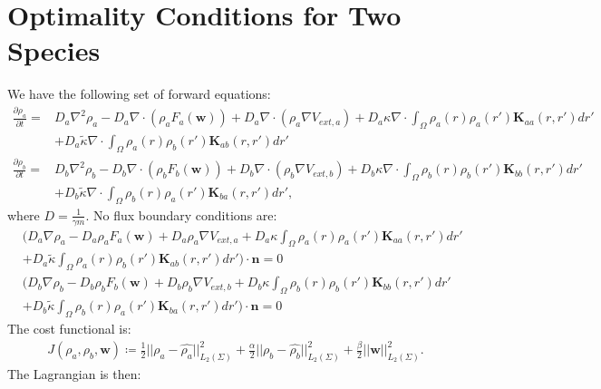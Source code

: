 \documentclass[11pt, a4paper]{article}
\theoremstyle{definition}
\newcommand{\ra}{\rho_a}
\newcommand{\rb}{\rho_b}
\newcommand{\w}{\mathbf{w}}
\newcommand{\n}{\mathbf{n}}
\newcommand{\K}{\mathbf{K}}
\begin{document}
	\section{Optimality Conditions for Two Species}
	We have the following set of forward equations:
	\begin{align*}
	\frac{\partial \ra}{\partial t} =& D_a\nabla^2 \ra - D_a\nabla \cdot(\ra F_a(\w)) + D_a \nabla \cdot (\ra \nabla V_{ext,a}) + D_a\kappa \nabla \cdot \int_\Omega \ra(r) \ra (r') \K_{aa}(r,r')dr' \\
	&+  D_a\tilde{\kappa}\nabla \cdot \int_\Omega \ra(r) \rb (r') \K_{ab}(r,r')dr'\\
	\frac{\partial \rb}{\partial t} =& D_b\nabla^2 \rb - D_b\nabla \cdot(\rb F_b(\w)) + D_b \nabla \cdot (\rb \nabla V_{ext,b}) + D_b\kappa \nabla \cdot \int_\Omega \rb(r) \rb (r') \K_{bb}(r,r')dr' \\
	&+  D_b\tilde{\kappa} \nabla \cdot \int_\Omega \rb(r) \ra (r') \K_{ba}(r,r')dr',
	\end{align*}
	where $D = \frac{1}{\gamma m}$.
	No flux boundary conditions are:
	\begin{align*}
	&\bigg( D_a \nabla \ra - D_a \ra F_a(\w) + D_a \ra \nabla V_{ext,a} + D_a\kappa \int_\Omega \ra(r) \ra (r') \K_{aa}(r,r')dr' \\
	&+  D_a\tilde{\kappa} \int_\Omega \ra(r) \rb (r') \K_{ab}(r,r')dr' \bigg) \cdot \n = 0\\
	&\bigg( D_b \nabla \rb - D_b \rb F_b(\w) + D_b \rb \nabla V_{ext,b} + D_b\kappa \int_\Omega \rb(r) \rb (r')\K_{bb}(r,r')dr' \\
	&+  D_b\tilde{\kappa} \int_\Omega \rb(r) \ra (r') \K_{ba}(r,r')dr' \bigg) \cdot \n = 0
	\end{align*}
	The cost functional is:
	\begin{align*}
	J(\ra,\rb, \w) \coloneqq \frac{1}{2}|| \ra - \widehat{\ra} ||^2_{L_2(\Sigma)} + \frac{\alpha}{2}|| \rb - \widehat {\rb} ||^2_{L_2(\Sigma)} + \frac{\beta}{2}||\w||^2_{L_2(\Sigma)}.
	\end{align*}
	The Lagrangian is then:
\end{document}
